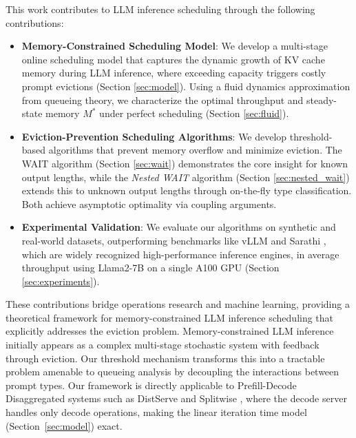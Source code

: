 This work contributes to LLM inference scheduling through the following contributions:
\begin{itemize}
\item \textbf{Memory-Constrained Scheduling Model}: We develop a multi-stage online scheduling model that captures the dynamic growth of KV cache memory during LLM inference, where exceeding capacity triggers costly prompt evictions (Section \ref{sec:model}). Using a fluid dynamics approximation from queueing theory, we characterize the optimal throughput and steady-state memory $M^*$ under perfect scheduling (Section \ref{sec:fluid}).
    \item \textbf{Eviction-Prevention Scheduling Algorithms}: We develop threshold-based algorithms that prevent memory overflow and minimize eviction. The WAIT algorithm (Section \ref{sec:wait}) demonstrates the core insight for known output lengths, while the \textit{Nested WAIT} algorithm (Section \ref{sec:nested_wait}) extends this to unknown output lengths through on-the-fly type classification. Both achieve asymptotic optimality via coupling arguments.
    \item \textbf{Experimental Validation}: We evaluate our algorithms on synthetic and real-world datasets, outperforming benchmarks like vLLM \citep{kwon2023efficient} and Sarathi \citep{agrawal2023sarathi}, which are widely recognized high-performance inference engines, in average throughput using Llama2-7B on a single A100 GPU (Section \ref{sec:experiments}).
\end{itemize}
These contributions bridge operations research and machine learning, providing a theoretical framework for memory-constrained LLM inference scheduling that explicitly addresses the eviction problem. Memory-constrained LLM inference initially appears as a complex multi-stage stochastic system with feedback through eviction. Our threshold mechanism transforms this into a tractable problem amenable to queueing analysis by decoupling the interactions between prompt types. Our framework is directly applicable to Prefill-Decode Disaggregated systems such as DistServe \citep{zhong2024distserve} and Splitwise \citep{patel2024splitwise}, where the decode server handles only decode operations, making the linear iteration time model (Section~\ref{sec:model}) exact.

